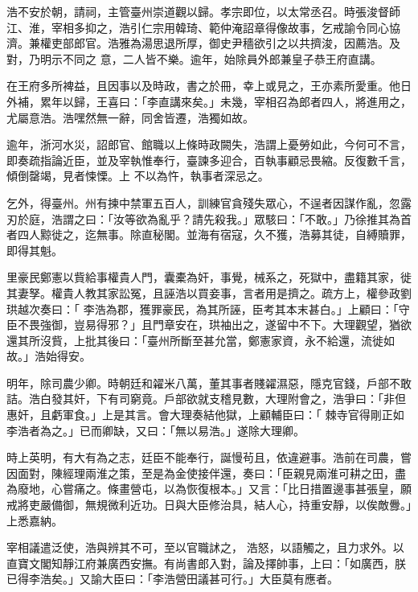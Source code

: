 \begin{pinyinscope}
 浩不安於朝，請祠，主管臺州崇道觀以歸。孝宗即位，以太常丞召。時張浚督師江、淮，宰相多抑之，浩引仁宗用韓琦、範仲淹詔章得像故事，乞戒諭令同心協濟。兼權吏部郎官。浩雅為湯思退所厚，御史尹穡欲引之以共擠浚，因薦浩。及對，乃明示不同之
 意，二人皆不樂。逾年，始除員外郎兼皇子恭王府直講。



 在王府多所裨益，且因事以及時政，書之於冊，幸上或見之，王亦素所愛重。他日外補，累年以歸，王喜曰：「李直講來矣。」未幾，宰相召為郎者四人，將進用之，尤屬意浩。浩嘿然無一辭，同舍皆遷，浩獨如故。



 逾年，浙河水災，詔郎官、館職以上條時政闕失，浩謂上憂勞如此，今何可不言，即奏疏指論近臣，並及宰執惟奉行，臺諫多迎合，百執事顧忌畏縮。反復數千言，傾倒罄竭，見者悚慄。上
 不以為忤，執事者深忌之。



 乞外，得臺州。州有揀中禁軍五百人，訓練官貪殘失眾心，不逞者因謀作亂，忽露刃於庭，浩謂之曰：「汝等欲為亂乎？請先殺我。」眾駭曰：「不敢。」乃徐推其為首者四人黥徙之，迄無事。除直秘閣。並海有宿寇，久不獲，浩募其徒，自縛贖罪，即得其魁。



 里豪民鄭憲以貲給事權貴人門，囊橐為奸，事覺，械系之，死獄中，盡籍其家，徙其妻孥。權貴人教其家訟冤，且誣浩以買妾事，言者用是擠之。疏方上，權參政劉珙越次奏曰：「
 李浩為郡，獲罪豪民，為其所誣，臣考其本末甚白。」上顧曰：「守臣不畏強御，豈易得邪？」且門章安在，珙袖出之，遂留中不下。大理觀望，猶欲還其所沒貲，上批其後曰：「臺州所斷至甚允當，鄭憲家資，永不給還，流徙如故。」浩始得安。



 明年，除司農少卿。時朝廷和糴米八萬，董其事者賤糴濕惡，隱克官錢，戶部不敢詰。浩白發其奸，下有司窮竟。戶部欲就支稽見數，大理附會之，浩爭曰：「非但惠奸，且虧軍食。」上是其言。會大理奏結他獄，上顧輔臣曰：「
 棘寺官得剛正如李浩者為之。」已而卿缺，又曰：「無以易浩。」遂除大理卿。



 時上英明，有大有為之志，廷臣不能奉行，誕慢茍且，依違避事。浩前在司農，嘗因面對，陳經理兩淮之策，至是為金使接伴還，奏曰：「臣親見兩淮可耕之田，盡為廢地，心嘗痛之。條畫營屯，以為恢復根本。」又言：「比日措置邊事甚張皇，願戒將吏嚴備御，無規微利近功。日與大臣修治具，結人心，持重安靜，以俟敵釁。」上悉嘉納。



 宰相議遣泛使，浩與辨其不可，至以官職訹之，
 浩怒，以語觸之，且力求外。以直寶文閣知靜江府兼廣西安撫。有尚書郎入對，論及擇帥事，上曰：「如廣西，朕已得李浩矣。」又諭大臣曰：「李浩營田議甚可行。」大臣莫有應者。




\end{pinyinscope}
